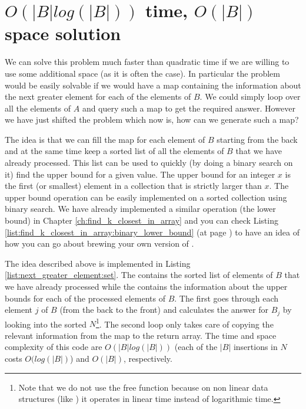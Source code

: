 \section{$O(|B|log(|B|))$ time, $O(|B|)$ space solution}
\label{next_greater_element:sec:nlogntime}
We can solve this problem much faster than quadratic time if we are willing to use some additional
space (as it is often the case). In particular the problem would be easily solvable if we would have
a map containing the information about the next greater element for each of the elements of $B$. We
could simply loop over all the elements of $A$ and query such a map to get the required answer.
However we have just shifted the problem which now is, how can we generate such a map?

The idea is that we can fill the map for each element of $B$ starting from the back and at the same
time keep a sorted list of all the elements of $B$ that we have already processed. This list can be
used to quickly (by doing a binary search on it) find the upper bound for a given value. The upper
bound for an integer $x$ is the first (or smallest) element in a collection that is strictly larger
than $x$. The upper bound operation can be easily implemented on a sorted collection using binary
search. We have already implemented a similar operation (the lower bound) in Chapter
\ref{ch:find_k_closest_in_array} and you can check Listing
\ref{list:find_k_closest_in_array:binary_lower_bound} (at page
\pageref{list:find_k_closest_in_array:binary_lower_bound}) to have an idea of how you can go about
brewing  your own version of .


The idea described above is implemented in Listing \ref{list:next_greater_element:set}. The
 contains the sorted list of elements of $B$ that we have already processed
while the  contains the information about the upper bounds
for each of the processed elements of $B$. The first  goes through each element $j$ of
$B$ (from the back to the front) and calculates the answer for $B_j$ by looking into the sorted
 $N$\footnote{Note that we do not use the free function
\href{https://en.cppreference.com/w/cpp/algorithm/upper_bound}{} because on
non linear data structures (like ) it operates in linear time instead of
logarithmic time.}. The second  loop only takes care of copying the relevant information
from the map  to the return array. The time and space complexity of this code are
$O(|B|log(|B|))$ (each of the $|B|$ insertions in $N$ costs $O(log(|B|)$) and $O(|B|)$,
respectively.

